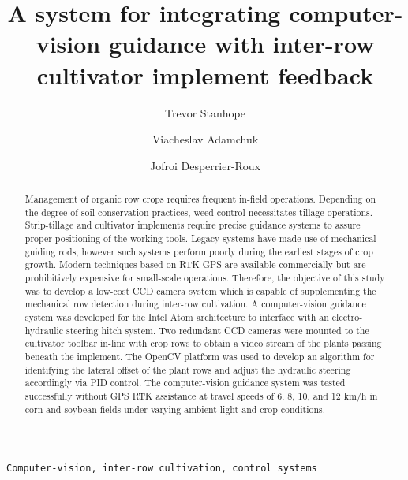 \documentclass[authoryear]{elsarticle}
\begin{document}
\begin{frontmatter}

\title{A system for integrating computer-vision guidance with inter-row cultivator
  implement feedback}
\author[rvt]{Trevor Stanhope}
\author[rvt]{Viacheslav Adamchuk}
\author[els]{Jofroi Desperrier-Roux}
\address[rvt]{McGill University, 21111 Lakeshore Road,
  Sainte-Anne-de-Bellevue, Quebec, Canada}
\address[els]{Agri-Fusion 2000, Inc., 481 Chemine Saint Philippe,
  Saint-Polycarpe, Quebec, Canada}

\begin{abstract}
Management of organic row crops requires frequent in-field
operations. Depending on the degree of soil conservation practices, 
weed control necessitates tillage operations. Strip-tillage and
cultivator implements require precise guidance systems to
assure proper positioning of the working tools. Legacy systems have
made use of mechanical guiding rods, however such
systems perform poorly during the earliest stages of crop growth.
Modern techniques based on RTK GPS are available commercially but are
prohibitively expensive for small-scale operations.
Therefore, the objective of this study was to develop a low-cost CCD 
camera system which is capable of supplementing the mechanical row
detection during inter-row cultivation.
A computer-vision guidance system was developed for the Intel Atom 
architecture to interface with an electro-hydraulic steering hitch system.
Two redundant CCD cameras were mounted to the cultivator toolbar
in-line with crop rows to obtain a video stream of the plants passing
beneath the implement. The OpenCV platform was used to develop an
algorithm for identifying the lateral offset of the plant rows and
adjust the hydraulic steering accordingly via PID control. The
computer-vision guidance system was tested successfully without GPS
RTK assistance at travel speeds of 6, 8, 10, and 12 km/h in corn and
soybean fields under varying ambient light and crop conditions.
\end{abstract}

\begin{keyword}
\texttt{Computer-vision, inter-row cultivation, control systems}
\end{keyword}

\end{frontmatter}

\end{document}
